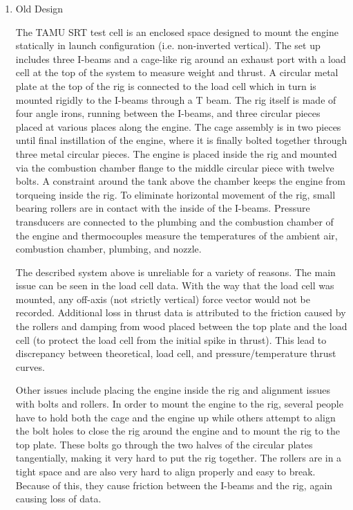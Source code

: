 \documentclass[10pt,a4paper]{article}
\begin{document}
 \begin{enumerate}
 	\item Old Design
 	
   The TAMU SRT test cell is an enclosed space designed to mount the engine statically in launch configuration (i.e. non-inverted vertical). The set up includes three I-beams and a cage-like rig around an exhaust port with a load cell at the top of the system to measure weight and thrust. A circular metal plate at the top of the rig is connected to the load cell which in turn is mounted rigidly to the I-beams through a T beam. The rig itself is made of four angle irons, running between the I-beams, and three circular pieces placed at various places along the engine. The cage assembly is in two pieces until final instillation of the engine, where it is finally bolted together through three metal circular pieces. The engine is placed inside the rig and mounted via the combustion chamber flange to the middle circular piece with twelve bolts. A constraint around the tank above the chamber keeps the engine from torqueing inside the rig. To eliminate horizontal movement of the rig, small bearing rollers are in contact with the inside of the I-beams. Pressure transducers are connected to the plumbing and the combustion chamber of the engine and thermocouples measure the temperatures of the ambient air, combustion chamber, plumbing, and nozzle. 

   The described system above is unreliable for a variety of reasons. The main issue can be seen in the load cell data. With the way that the load cell was mounted, any off-axis (not strictly vertical) force vector would not be recorded. Additional loss in thrust data is attributed to the friction caused by the rollers and damping from wood placed between the top plate and the load cell (to protect the load cell from the initial spike in thrust). This lead to discrepancy between theoretical, load cell, and pressure/temperature thrust curves. 

   Other issues include placing the engine inside the rig and alignment issues with bolts and rollers. In order to mount the engine to the rig, several people have to hold both the cage and the engine up while others attempt to align the bolt holes to close the rig around the engine and to mount the rig to the top plate. These bolts go through the two halves of the circular plates tangentially, making it very hard to put the rig together. The rollers are in a tight space and are also very hard to align properly and easy to break. Because of this, they cause friction between the I-beams and the rig, again causing loss of data.


\end{enumerate}
\end{document}
